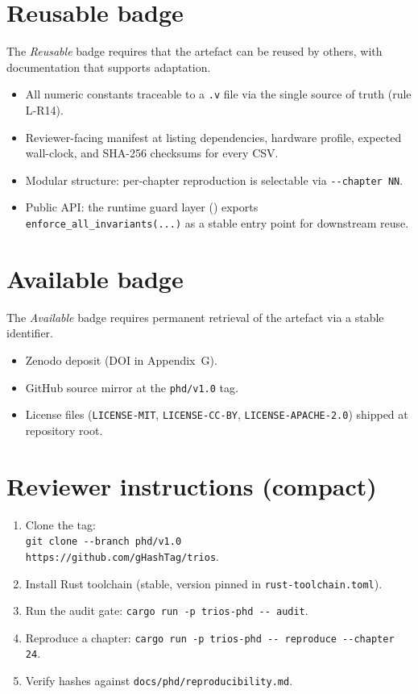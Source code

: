 \section{Reusable badge}

The \emph{Reusable} badge requires that the artefact can be reused by
others, with documentation that supports adaptation.

\begin{itemize}
  \item All numeric constants traceable to a \verb|.v| file via the
        single source of truth (rule L-R14).
  \item Reviewer-facing manifest at 
        listing dependencies, hardware profile, expected wall-clock,
        and SHA-256 checksums for every CSV.
  \item Modular structure: per-chapter reproduction is selectable via
        \verb|--chapter NN|.
  \item Public API: the runtime guard layer
        () exports
        \verb|enforce_all_invariants(...)| as a stable entry point
        for downstream reuse.
\end{itemize}

\section{Available badge}

The \emph{Available} badge requires permanent retrieval of the
artefact via a stable identifier.

\begin{itemize}
  \item Zenodo deposit (DOI in Appendix~G).
  \item GitHub source mirror at the \verb|phd/v1.0| tag.
  \item License files (\texttt{LICENSE-MIT}, \texttt{LICENSE-CC-BY},
        \texttt{LICENSE-APACHE-2.0}) shipped at repository root.
\end{itemize}

\section{Reviewer instructions (compact)}

\begin{enumerate}
  \item Clone the tag: \\
        \verb|git clone --branch phd/v1.0|\\
        \quad\verb|https://github.com/gHashTag/trios|.
  \item Install Rust toolchain (stable, version pinned in
        \verb|rust-toolchain.toml|).
  \item Run the audit gate: \verb|cargo run -p trios-phd -- audit|.
  \item Reproduce a chapter: \verb|cargo run -p trios-phd -- reproduce --chapter 24|.
  \item Verify hashes against \verb|docs/phd/reproducibility.md|.
\end{enumerate}

